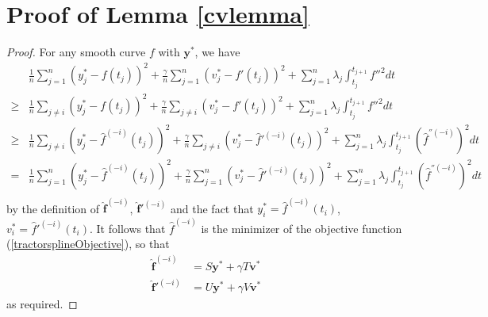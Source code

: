 \section{Proof of Lemma \ref{cvlemma}}
\begin{proof}
For any smooth curve $f$ with $\mathbf{y}^*$, we have 
\begin{align*}
&\frac{1}{n} \sum_{j=1}^n\left(y_j^*-f(t_j)\right)^2+\frac{\gamma}{n} \sum_{j=1}^n\left(v_j^*-f'(t_j)\right)^2+\sum_{j=1}^{n} \lambda_j\int_{t_j}^{t_{j+1}} f''^2dt \\
\geq &\frac{1}{n} \sum_{j\neq i}\left(y_j^*-f(t_j)\right)^2+\frac{\gamma}{n} \sum_{j\neq i}\left(v_j^*-f'(t_j)\right)^2+\sum_{j=1}^{n} \lambda_j\int_{t_j}^{t_{j+1}} f''^2dt\\
\geq &\frac{1}{n}\sum_{j\neq i}\left(y_j^*-\hat{f}^{(-i)}(t_j)\right)^2+\frac{\gamma}{n} \sum_{j\neq i}\left(v_j^*-\hat{f}'^{(-i)}(t_j)\right)^2+\sum_{j=1}^{n} \lambda_j\int_{t_j}^{t_{j+1}}  \left(\hat{f}^{''(-i)}\right)^2dt\\
= &\frac{1}{n}\sum_{j=1}^{n}\left(y_j^*-\hat{f}^{(-i)}(t_j)\right)^2+\frac{\gamma}{n} \sum_{j=1}^{n}\left(v_j^*-\hat{f}'^{(-i)}(t_j)\right)^2+\sum_{j=1}^{n} \lambda_j\int_{t_j}^{t_{j+1}}  \left(\hat{f}^{''(-i)}\right)^2dt\\
\end{align*}
by the definition of $\mathbf{\hat{f}}^{(-i)}$, $\mathbf{\hat{f}}'^{(-i)}$ and the fact that $y_i^*=\hat{f}^{(-i)}(t_i)$, $v_i^*=\hat{f}'^{(-i)}(t_i)$. It follows that $\hat{f}^{(-i)}$ is the minimizer of the objective function (\ref{tractorsplineObjective}), so that
\begin{align*}
\mathbf{\hat{f}}^{(-i)}&=S\mathbf{y}^*+\gamma T\mathbf{v}^*\\
\mathbf{\hat{f}}'^{(-i)}&=U\mathbf{y}^*+\gamma V\mathbf{v}^*
\end{align*}
as required.
\end{proof}


